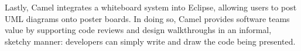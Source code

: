 Lastly, Camel \cite{cataldo2009camel} integrates a whiteboard system into Eclipse, allowing users to post UML diagrams onto poster boards. In doing so, Camel provides software teams value by supporting code reviews and design walkthroughs in an informal, sketchy manner: developers can simply write and draw the code being presented.


